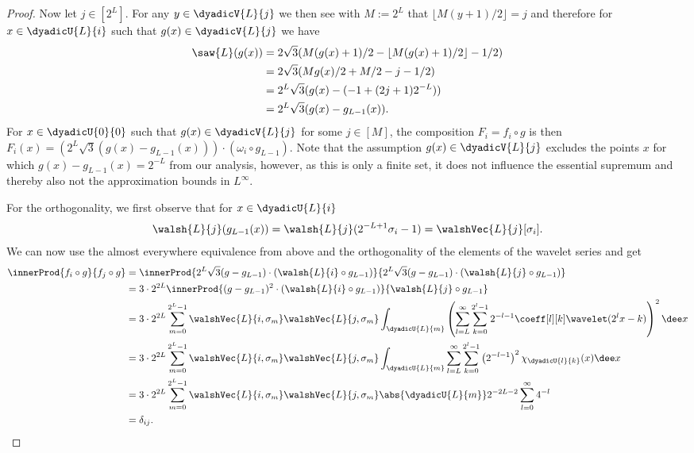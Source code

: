 \documentclass[twoside,11pt]{article}
\newcommand{\defeq}{\mathbin{:=}}
\begin{document}
\begin{proof}
Now let $j\in[2^L]$.
For any $y\in\dyadicV{L}{j}$ we then see with $M\defeq 2^L$ that $\lfloor M(y+1)/2\rfloor=j$ and therefore for $x\in\dyadicU{L}{i}$ such that $g(x)\in\dyadicV{L}{j}$ we have
\begin{align}
    \saw{L}(g(x))
    &=
    2\sqrt{3}(M(g(x)+1)/2-\lfloor M(g(x)+1)/2\rfloor-1/2)
    \\&
    =
    2\sqrt{3}(Mg(x)/2+M/2-j-1/2)
    \\&
    =
    2^{L}\sqrt{3}(g(x)-(-1+(2j+1)2^{-L}))
    \\&
    =
    2^{L}\sqrt{3}(g(x)-g_{L-1}(x)).
\end{align}
For $x\in\dyadicU{0}{0}$ such that $g(x)\in\dyadicV{L}{j}$ for some $j\in[M]$, the composition $F_i=f_i\circ g$ is then $F_i(x)=(2^{L}\sqrt{3}(g(x)-g_{L-1}(x)))\cdot(\omega_i\circ g_{L-1})$.
Note that the assumption $g(x)\in\dyadicV{L}{j}$ excludes the points $x$ for which $g(x)-g_{L-1}(x)=2^{-L}$ from our analysis, however, as this is only a finite set, it does not influence the essential supremum and thereby also not the approximation bounds in $L^\infty$.

For the orthogonality, we first observe that for $x\in\dyadicU{L}{i}$
\begin{align}
    \walsh{L}{j}(g_{L-1}(x))
    =
    \walsh{L}{j}(2^{-L+1}\sigma_i-1)
    =
    \walshVec{L}{j}[\sigma_i].
\end{align}
We can now use the almost everywhere equivalence from above and the orthogonality of the elements of the wavelet series and get
\begin{align}
    \innerProd{f_i\circ g}{f_j\circ g}
    &=
    \innerProd{2^L\sqrt{3}(g-g_{L-1})\cdot (\walsh{L}{i}\circ g_{L-1})}{2^L\sqrt{3}(g-g_{L-1})\cdot (\walsh{L}{j}\circ g_{L-1})}
    \\&
    =3\cdot 2^{2L}\innerProd{(g-g_{L-1})^2\cdot(\walsh{L}{i}\circ g_{L-1})}{\walsh{L}{j}\circ g_{L-1}}
    \\&
    =
    3\cdot 2^{2L}\sum_{m=0}^{2^L-1}\walshVec{L}{i,\sigma_m}\walshVec{L}{j,\sigma_m}
    \int_{\dyadicU{L}{m}}\left(\sum_{l=L}^\infty\sum_{k=0}^{2^l-1}2^{-l-1}\coeff[l][k]\wavelet(2^lx-k)\right)^2\dee x
    \\&
    =
    3\cdot 2^{2L}\sum_{m=0}^{2^L-1}\walshVec{L}{i,\sigma_m}\walshVec{L}{j,\sigma_m}
    \int_{\dyadicU{L}{m}}\sum_{l=L}^\infty\sum_{k=0}^{2^l-1}\left(2^{-l-1}\right)^2\chi_{\dyadicU{l}{k}}(x)\dee x
    \\&
    =
    3\cdot 2^{2L}\sum_{m=0}^{2^L-1}\walshVec{L}{i,\sigma_m}\walshVec{L}{j,\sigma_m}
    \abs{\dyadicU{L}{m}}2^{-2L-2}\sum_{l=0}^\infty 4^{-l}
    \\&
    =
    \delta_{ij}.
\end{align}
\end{proof}
\end{document}
